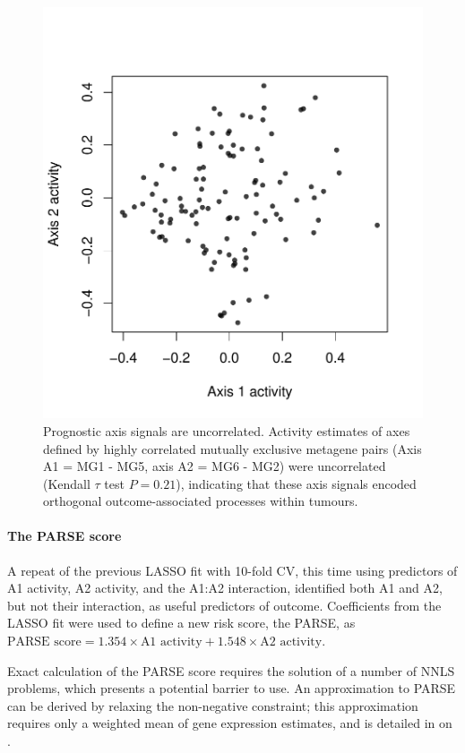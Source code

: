 \documentclass[dissertation.tex]{subfiles}
\begin{document}
\begin{figure}[!htbp]
\centering
\includegraphics[width=.7\linewidth]{analysis/biosurv/reports/18_SIS_diag_dsd_final/figure/metagene-pairs-10}
\caption[Prognostic axes are uncorrelated]{Prognostic axis signals are uncorrelated.  Activity estimates of axes defined by highly correlated mutually exclusive metagene pairs (Axis A1 = MG1 - MG5, axis A2 = MG6 - MG2) were uncorrelated (Kendall $\tau$ test $P = 0.21$), indicating that these axis signals encoded orthogonal outcome-associated processes within tumours.}\label{fig:sigs-axis-pairs}
\end{figure}

\paragraph{The \texorpdfstring{\acrshort{PARSE}}{PARSE} score}
A repeat of the previous \gls{LASSO} fit with 10-fold \gls{CV}, this time using predictors of A1 activity, A2 activity, and the A1:A2 interaction, identified both A1 and A2, but not their interaction, as useful predictors of outcome.  Coefficients from the \gls{LASSO} fit were used to define a new risk score, the \gls{PARSE}, as $\text{PARSE score} = 1.354 \times \text{A1 activity} + 1.548 \times \text{A2 activity}$.

Exact calculation of the \gls{PARSE} score requires the solution of a number of \gls{NNLS} problems, which presents a potential barrier to use.  An approximation to \gls{PARSE} can be derived by relaxing the non-negative constraint; this approximation requires only a weighted mean of gene expression estimates, and is detailed in  on .
\end{document}
